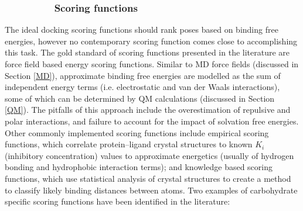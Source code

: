 \documentclass[journal=jctcce,manuscript=article]{achemso}
\begin{document}
{\subsubsection*{~~~~~~~~~Scoring functions}

The ideal docking scoring functions should rank poses based on binding free energies, however no contemporary scoring function comes close to accomplishing this task.\cite{Schulz-Gasch2004ScoringPerspective}
The gold standard of scoring functions presented in the literature are force field based energy scoring functions. Similar to \ac{MD} force fields (discussed in Section \ref{MD}), approximate binding free energies are modelled as the sum of independent energy terms (i.e. electrostatic and van der Waals interactions), some of which can be determined by \ac{QM} calculations (discussed in Section \ref{QM}).\cite{Schulz-Gasch2004ScoringPerspective}
The pitfalls of this approach include the overestimation of repulsive and polar interactions, and failure to account for the impact of solvation free energies. \cite{Gandhi2009FreeInteractions, Schulz-Gasch2004ScoringPerspective, Dommert2012ForceDevelopments, Shoichet1999LigandDocking}
Other commonly implemented scoring functions include empirical scoring functions, which correlate protein--ligand crystal structures to known $K_{i}$ (inhibitory concentration) values to approximate energetics (usually of hydrogen bonding and hydrophobic interaction terms); and knowledge based scoring functions, which use statistical analysis of crystal structures to create a method to classify likely binding distances between atoms.\cite{Schulz-Gasch2004ScoringPerspective}
Two examples of carbohydrate specific scoring functions have been identified in the literature:

}
\end{document}
